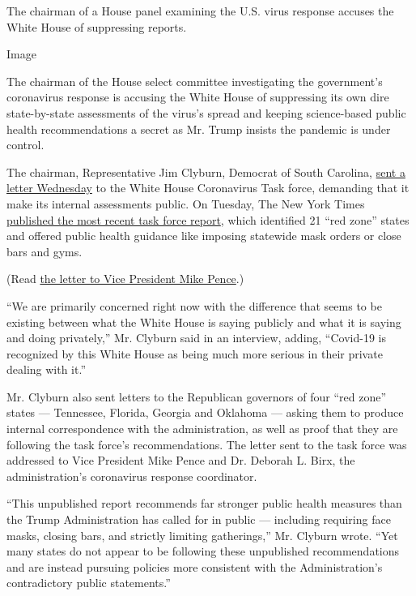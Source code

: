 The chairman of a House panel examining the U.S. virus response accuses
the White House of suppressing reports.

Image

The chairman of the House select committee investigating the
government's coronavirus response is accusing the White House of
suppressing its own dire state-by-state assessments of the virus's
spread and keeping science-based public health recommendations a secret
as Mr. Trump insists the pandemic is under control.

The chairman, Representative Jim Clyburn, Democrat of South Carolina,
\href{https://int.graylady3jvrrxbe.onion/data/documenttools/clyburn-letter-to-pence/5eaf7827a6dbb331/full.pdf}{sent
a letter Wednesday} to the White House Coronavirus Task force, demanding
that it make its internal assessments public. On Tuesday, The New York
Times
\href{https://www.nytimes3xbfgragh.onion/interactive/2020/07/28/us/states-report-virus-response-july-26.html}{published
the most recent task force report}, which identified 21 ``red zone''
states and offered public health guidance like imposing statewide mask
orders or close bars and gyms.

(Read
\href{https://int.graylady3jvrrxbe.onion/data/documenttools/clyburn-letter-to-pence/5eaf7827a6dbb331/full.pdf}{the
letter to Vice President Mike Pence}.)

``We are primarily concerned right now with the difference that seems to
be existing between what the White House is saying publicly and what it
is saying and doing privately,'' Mr. Clyburn said in an interview,
adding, ``Covid-19 is recognized by this White House as being much more
serious in their private dealing with it.''

Mr. Clyburn also sent letters to the Republican governors of four ``red
zone'' states --- Tennessee, Florida, Georgia and Oklahoma --- asking
them to produce internal correspondence with the administration, as well
as proof that they are following the task force's recommendations. The
letter sent to the task force was addressed to Vice President Mike Pence
and Dr. Deborah L. Birx, the administration's coronavirus response
coordinator.

``This unpublished report recommends far stronger public health measures
than the Trump Administration has called for in public --- including
requiring face masks, closing bars, and strictly limiting gatherings,''
Mr. Clyburn wrote. ``Yet many states do not appear to be following these
unpublished recommendations and are instead pursuing policies more
consistent with the Administration's contradictory public statements.''

